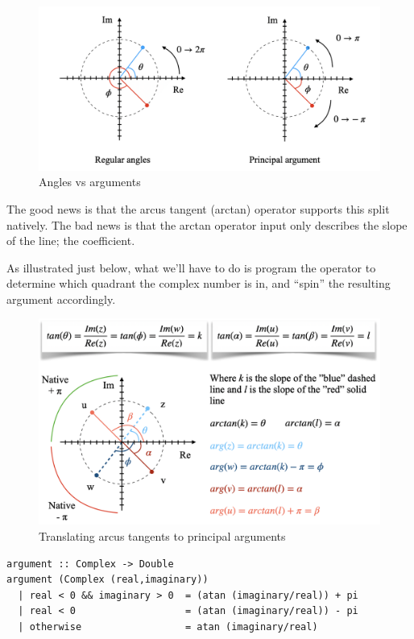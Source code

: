 \begin{figure}[h!]
    \centering
    \includegraphics[scale= 0.45]{arg.png}
    \caption{Angles vs arguments}
    \label{arg}
\end{figure}

The good news is that the arcus tangent (arctan) operator supports this split natively. The bad news is that the arctan operator input only describes the slope of the line; the coefficient.

As illustrated just below, what we'll have to do is program the operator to determine which quadrant the complex number is in, and ``spin'' the resulting argument accordingly.

\begin{figure}[h!]
    \centering
    \includegraphics[scale= 0.5]{tan.png}
    \caption{Translating arcus tangents to principal arguments}
    \label{tan}
\end{figure}

\begin{verbatim}
argument :: Complex -> Double
argument (Complex (real,imaginary))
  | real < 0 && imaginary > 0  = (atan (imaginary/real)) + pi
  | real < 0                   = (atan (imaginary/real)) - pi
  | otherwise                  = atan (imaginary/real)
\end{verbatim}

